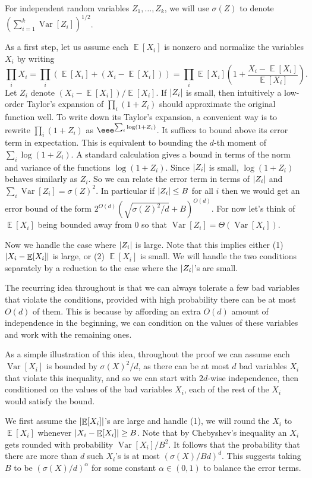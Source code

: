 \documentclass{toc}
\DeclarePairedDelimiter{\abs}{\lvert}{\rvert}
\DeclareMathOperator*{\E}{\mathbb{E}}                 %
\DeclareMathOperator*{\Var}{Var}                 %
\begin{document}
  For independent random variables $Z_1, \ldots, Z_k$, we will use $\sigma(Z)$ to denote $(\sum_{i = 1}^k \Var[Z_i])^{1/2}$.

  As a first step, let us assume each $\E[X_i]$ is nonzero and normalize the variables $X_i$ by writing
  \[
    \prod_i X_i
    = \prod_i (\E[X_i] + (X_i - \E[X_i]))
    = \prod_i \E[X_i] \left( 1 + \frac{X_i - \E[X_i]}{\E[X_i]} \right) .
  \]
  Let $Z_i$ denote $(X_i - \E[X_i]) / \E[X_i]$.
  If $\abs{Z_i}$ is small, then intuitively a low-order Taylor's expansion of $\prod_i (1 + Z_i)$ should approximate the original function well.
  To write down its Taylor's expansion, a convenient way is to rewrite $\prod_i (1 + Z_i)$ as $\eee^{\sum_i \log(1 + Z_i)}$.
  It suffices to bound above its error term in expectation.
  This is equivalent to bounding the $d$-th moment of $\sum_i \log(1 + Z_i)$.
  A standard calculation gives a bound in terms of the norm and variance of the functions $\log(1 + Z_i)$.
  Since $\abs{Z_i}$ is small, $\log(1 + Z_i)$ behaves similarly as $Z_i$.
  So we can relate the error term in terms of $\abs{Z_i}$ and $\sum_i \Var[Z_i] = \sigma(Z)^2$.
  In particular if $\abs{Z_i} \le B$ for all $i$ then we would get an error bound of the form $2^{O(d)} (\sqrt{\sigma(Z)^2 / d} + B)^{O(d)}$.
  For now let's think of $\E[X_i]$ being bounded away from $0$ so that $\Var[Z_i] = \Theta(\Var[X_i])$.

  Now we handle the case where $\abs{Z_i}$ is large.
  Note that this implies either (1) $\abs{X_i - \E[X_i]}$ is large, or (2) $\E[X_i]$ is small.
  We will handle the two conditions separately by a reduction to the case where the $\abs{Z_i}$'s are small.

  The recurring idea throughout is that we can always tolerate a few bad variables that violate the conditions, provided with high probability there can be at most $O(d)$ of them.
  This is because by affording an extra $O(d)$ amount of independence in the beginning, we can condition on the values of these variables and work with the remaining ones.

  As a simple illustration of this idea, throughout the proof we can assume each $\Var[X_i]$ is bounded by $\sigma(X)^2/d$, as there can be at most $d$ bad variables $X_i$ that violate this inequality, and so we can start with $2d$-wise independence, then conditioned on the values of the bad variables $X_i$, each of the rest of the $X_i$ would satisfy the bound.

  We first assume the $\abs{\E[X_i]}$'s are large and handle (1), we will round the $X_i$ to $\E[X_i]$ whenever $\abs{X_i - \E[X_i]} \ge B$.
  Note that by Chebyshev's inequality an $X_i$ gets rounded with probability $\Var[X_i]/B^2$.
  It follows that the probability that there are more than $d$ such $X_i$'s is at most $(\sigma(X) / B d)^d$.
  This suggests taking $B$ to be $(\sigma(X)/d)^\alpha$ for some constant $\alpha \in (0, 1)$ to balance the error terms.
\end{document}
